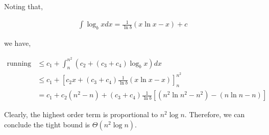\begin{enumerate}
          Noting that,

          \begin{align*}
              \int \log_b{x} dx = \frac{1}{\ln{b}} \left( x\ln{x} - x \right) + c
          \end{align*}

          we have,

          \begin{align*}
              \text{running time} & \le c_1 + \int_{n}^{n^2} \left( c_2 + \left( c_3 + c_4 \right) \log_b{x} \right) dx                                                                          \\
                                  & \le c_1 + \left[ c_2 x + \left( c_3 + c_4 \right) \frac{1}{\ln{b}} \left( x\ln{x} - x \right) \right]_n^{n^2}                                                \\
                                  & =  c_1 + c_2 \left( n^2 - n \right) + \left( c_3 + c_4 \right) \frac{1}{\ln{b}} \left[ \left( n^2\ln{n^2} - n^2 \right) - \left( n\ln{n} - n \right) \right]
          \end{align*}

          Clearly, the highest order term is proportional to $n^2 \log{n}$. Therefore, we can conclude the tight
          bound is $\Theta\left(n^2 \log{n}\right)$.

\end{enumerate}
